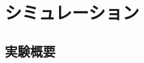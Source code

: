 \documentclass[./_thesis]{subfiles}
\begin{document}
\chapter{シミュレーション}
\begin{spacing}{2.0}
\section{実験概要}

\end{spacing}
\end{document}
